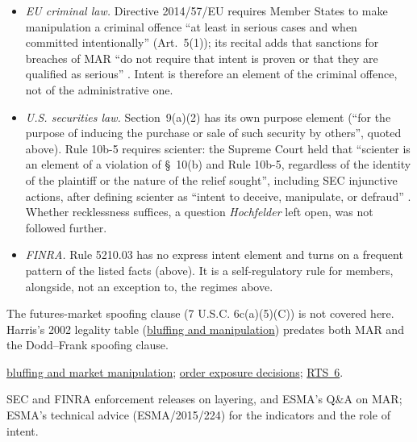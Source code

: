 \begin{qfrule}
\begin{itemize}
ESMA said so in its technical advice: ``even situations that were not committed with intent are under the scope of market manipulation of MAR'', and an indicator or example that seems to describe manipulative intent ``does not imply that, in the absence of the intent that conduct might not fall within the scope of the definition'' \citep[Annex~III, feedback on Q1, para.~12, printed p.~78; sec.~2.2.2, para.~8, printed p.~9]{esma-2015-224}.
\item \emph{EU criminal law.} Directive 2014/57/EU requires Member States to make manipulation a criminal offence ``at least in serious cases and when committed intentionally'' (Art.~5(1)); its recital adds that sanctions for breaches of MAR ``do not require that intent is proven or that they are qualified as serious'' \citep[Art.~5(1); recital~23]{eu-2014-57-csmad}. Intent is therefore an element of the criminal offence, not of the administrative one.
\item \emph{U.S. securities law.} Section~9(a)(2) has its own purpose element (``for the purpose of inducing the purchase or sale of such security by others'', quoted above). Rule 10b-5 requires scienter: the Supreme Court held that ``scienter is an element of a violation of \S~10(b) and Rule 10b-5, regardless of the identity of the plaintiff or the nature of the relief sought'', including SEC injunctive actions, after defining scienter as ``intent to deceive, manipulate, or defraud'' \citep[Aaron v.\ SEC, 446 U.S. 680 (1980), syllabus and opinion, pp.~689--695; Ernst \& Ernst v.\ Hochfelder, 425 U.S. 185 (1976), syllabus, pp.~194--214]{us-scienter-cases}. Whether recklessness suffices, a question \emph{Hochfelder} left open, was not followed further.
\item \emph{FINRA.} Rule 5210.03 has no express intent element and turns on a frequent pattern of the listed facts (above). It is a self-regulatory rule for members, alongside, not an exception to, the regimes above.
\end{itemize}
The futures-market spoofing clause (7 U.S.C. 6c(a)(5)(C)) is not covered here. Harris's 2002 legality table (\hyperref[def:bluffing-manipulation]{bluffing and manipulation}) predates both MAR and the Dodd--Frank spoofing clause.

 \hyperref[def:bluffing-manipulation]{bluffing and market manipulation}; \hyperref[def:order-exposure-decisions]{order exposure decisions}; \hyperref[rule:mifid-rts6-algorithmic-controls]{RTS~6}.

 SEC and FINRA enforcement releases on layering, and ESMA's Q\&A on MAR; ESMA's technical advice (ESMA/2015/224) for the indicators and the role of intent.

\end{qfrule}
